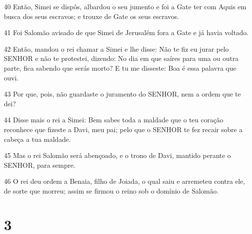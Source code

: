 \par 40 Então, Simei se dispôs, albardou o seu jumento e foi a Gate ter com Aquis em busca dos seus escravos; e trouxe de Gate os seus escravos.
\par 41 Foi Salomão avisado de que Simei de Jerusalém fora a Gate e já havia voltado.
\par 42 Então, mandou o rei chamar a Simei e lhe disse: Não te fiz eu jurar pelo SENHOR e não te protestei, dizendo: No dia em que saíres para uma ou outra parte, fica sabendo que serás morto? E tu me disseste: Boa é essa palavra que ouvi.
\par 43 Por que, pois, não guardaste o juramento do SENHOR, nem a ordem que te dei?
\par 44 Disse mais o rei a Simei: Bem sabes toda a maldade que o teu coração reconhece que fizeste a Davi, meu pai; pelo que o SENHOR te fez recair sobre a cabeça a tua maldade.
\par 45 Mas o rei Salomão será abençoado, e o trono de Davi, mantido perante o SENHOR, para sempre.
\par 46 O rei deu ordem a Benaia, filho de Joiada, o qual saiu e arremeteu contra ele, de sorte que morreu; assim se firmou o reino sob o domínio de Salomão.

\chapter{3}

